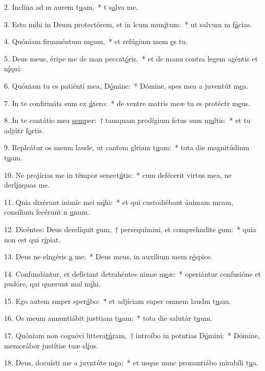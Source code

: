 2. Inclína ad m aurem t\uline{u}am,~* t s\uline{a}lva me.\par 
3. Esto mihi in Deum protectórem, et in lcum mun\uline{í}tum:~* ut salvum m f\uline{á}cias.\par 
4. Quóniam firmméntum m\uline{e}um,~* et refúgium mem \uline{e}s tu.\par 
5. Deus meus, éripe me de man peccat\uline{ó}ris,~* et de manu contra legem agéntis et n\uline{í}qui:\par 
6. Quóniam tu es patiénti mea, D\uline{ó}mine:~* Dómine, spes mea a juventút m\uline{e}a.\par 
7. In te confirmáts sum ex \uline{ú}tero:~* de ventre matris meæ tu es protéctr m\uline{e}us.\par 
8. In te cantátio mea \uline{sem}per:~† tamquam prodígium fctus sum m\uline{u}ltis:~* et tu adjútr f\uline{o}rtis.\par 
9. Repleátur os meum laude, ut cantem glriam t\uline{u}am:~* tota die magnitúdinm t\uline{u}am.\par 
10. Ne projícias me in témpor senect\uline{ú}tis:~* cum defécerit virtus mea, ne derl\uline{í}nquas me.\par 
11. Quia dixérunt inimíc mei m\uline{i}hi:~* et qui custodiébant ánimam meam, consílium fecérunt n \uline{u}num.\par 
12. Dicéntes: Deus derelíquit \uline{e}um,~† persequímini, et comprehndite \uline{e}um:~* quia non est qui r\uline{í}piat.\par 
13. Deus ne elngéris \uline{a} me:~* Deus meus, in auxílium mem r\uline{é}spice.\par 
14. Confundántur, et defíciant detrahéntes nimæ m\uline{e}æ:~* operiántur confusióne et pudóre, qui quærunt mal m\uline{i}hi.\par 
15. Ego autem smper sper\uline{á}bo:~* et adjíciam super omnem laudm t\uline{u}am.\par 
16. Os meum annuntiábit justtiam t\uline{u}am:~* tota die salutár t\uline{u}um.\par 
17. Quóniam non cognóvi littera\uline{tú}ram,~† introíbo in potntias D\uline{ó}mini:~* Dómine, memorábor justítiæ tuæ sl\uline{í}us.\par 
18. Deus, docuísti me a juvntúte m\uline{e}a:~* et usque nunc pronuntiábo mirabíli t\uline{u}a.\par 
